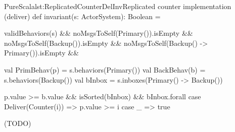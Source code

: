 \documentclass[a4paper,twoside]{article}
\newcommand{\TODO}[1]{\textcolor{YellowOrange}{(TODO)}} %
\newcommand{\RefCode}[1]{Listing~\ref{#1}}
\begin{document}
\begin{Code}{PureScala}{lst:ReplicatedCounterDelInv}{Replicated counter implementation (deliver)}
def invariant(s: ActorSystem): Boolean = {
  validBehaviors(s)                           &&
  noMsgsToSelf(Primary()).isEmpty             &&
  noMsgsToSelf(Backup()).isEmpty              &&
  noMsgsToSelf(Backup() -> Primary()).isEmpty && {
    val PrimBehav(p) = s.behaviors(Primary())
    val BackBehav(b) = s.behaviors(Backup())
    val bInbox       = s.inboxes(Primary() -> Backup())

    p.value >= b.value && isSorted(bInbox) && bInbox.forall {
      case Deliver(Counter(i)) => p.value >= i
      case _                   => true
    }
  }
}
\end{Code}

\TODO{Rep Counter Del Result}

%
%
%
%
%
%
%
%
%
%
\end{document}
